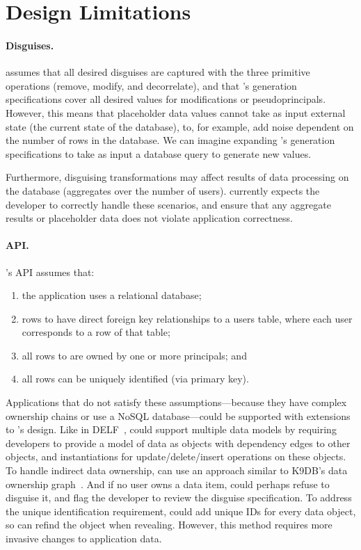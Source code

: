 \section{Design Limitations}
\label{s:design:limits}

\paragraph{Disguises.}
\sys assumes that all desired disguises are captured with the three primitive
operations (remove, modify, and decorrelate), and that \sys's generation
specifications cover all desired values for modifications or pseudoprincipals. 
%
However, this means that placeholder data values cannot take as input external
state (\eg the current state of the database), to, for example, add noise
dependent on the number of rows in the database.
%
We can imagine expanding \sys's generation specifications to take as input a
database query to generate new values.
%

%
Furthermore, disguising transformations may affect results of data processing on
the database (\eg aggregates over the number of users). \sys currently expects
the developer to correctly handle these scenarios, and ensure that any aggregate
results or placeholder data does not violate application correctness.
%

\paragraph{API.}
\sys's API assumes that:
\begin{enumerate}[nosep]
    \item the application uses a relational database;
    \item rows to \xx have direct foreign key relationships to a users table,
    where each user corresponds to a row of that table;
    \item all rows to \xx are owned by one or more principals; and
    \item all rows can be uniquely identified (\eg via primary key).
\end{enumerate}
%
Applications that do not satisfy these assumptions---\eg because they have
complex ownership chains or use a NoSQL database---could be supported with
extensions to \sys's design. 
%
Like in DELF~\cite{delf}, \sys could support multiple data models by requiring
developers to provide \one{} a model of data as objects with dependency edges to other objects,
and \two{} instantiations for update/delete/insert operations on these objects.
%
To handle indirect data ownership, \sys can use an approach similar to
K9DB's data ownership graph~\cite{k9db}. And if no user owns a data item, \sys
could perhaps refuse to disguise it, and flag the developer to review the
disguise specification.
%
To address the unique identification requirement, \sys could add unique IDs for every
data object, so \sys can refind the object when revealing. However, this method
requires more invasive changes to application data. 
%

